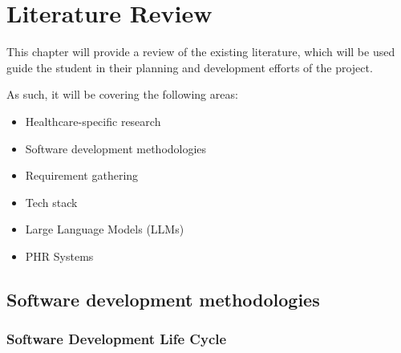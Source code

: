 \chapter{Literature Review}

This chapter will provide a review of the existing literature, which will be used guide the student in their planning and development efforts of the project.

\noindent As such, it will be covering the following areas:
\begin{itemize}
    \item Healthcare-specific research
    \item Software development methodologies
    \item Requirement gathering
    \item Tech stack
    \item Large Language Models (LLMs)
    \item PHR Systems
\end{itemize}

\section{Software development methodologies}
\subsection{Software Development Life Cycle}

